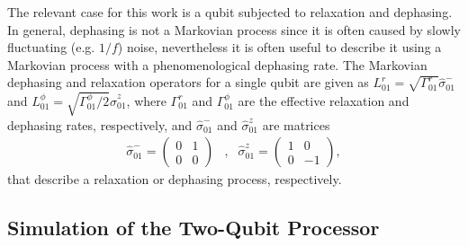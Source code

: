 \smallskip

The relevant case for this work is a qubit subjected to relaxation and dephasing. In general, dephasing is not a Markovian process since it is often caused by slowly fluctuating (e.g. $1/f$) noise, nevertheless it is often useful to describe it using a Markovian process with a phenomenological dephasing rate. The Markovian dephasing and relaxation operators for a single qubit are given as $L_{01}^{r}=\sqrt{\Gamma_{01}^{r}}\hat{\sigma}_{01}^-$ and $L_{01}^{\phi}=\sqrt{\Gamma_{01}^{\phi}/2}\hat{\sigma}_{01}^z$, where $\Gamma_{01}^{r}$ and $\Gamma_{01}^{\phi}$ are the effective relaxation and dephasing rates, respectively, and $\hat{\sigma}_{01}^-$ and $\hat{\sigma}_{01}^z$ are matrices
%
\begin{align}
\hat{\sigma}_{01}^-  =  \left( \begin{array}{cc} 0 & 1 \\ 0 & 0 \end{array} \right) &, & \hat{\sigma}_{01}^z  =  \left( \begin{array}{cc} 1 & 0 \\ 0 & -1 \end{array}\right),
\end{align}
%
that describe a relaxation or dephasing process, respectively. 


\subsection{Simulation of the Two-Qubit Processor}

